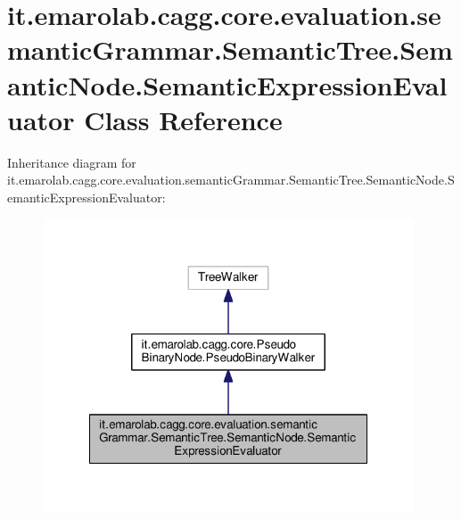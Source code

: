 \hypertarget{classit_1_1emarolab_1_1cagg_1_1core_1_1evaluation_1_1semanticGrammar_1_1SemanticTree_1_1Semantic4c3f840cd671383fb305cb0305b7229f}{\section{it.\-emarolab.\-cagg.\-core.\-evaluation.\-semantic\-Grammar.\-Semantic\-Tree.\-Semantic\-Node.\-Semantic\-Expression\-Evaluator Class Reference}
\label{classit_1_1emarolab_1_1cagg_1_1core_1_1evaluation_1_1semanticGrammar_1_1SemanticTree_1_1Semantic4c3f840cd671383fb305cb0305b7229f}
}


Inheritance diagram for it.\-emarolab.\-cagg.\-core.\-evaluation.\-semantic\-Grammar.\-Semantic\-Tree.\-Semantic\-Node.\-Semantic\-Expression\-Evaluator\-:\nopagebreak
\begin{figure}[H]
\begin{center}
\leavevmode
\includegraphics[width=312pt]{classit_1_1emarolab_1_1cagg_1_1core_1_1evaluation_1_1semanticGrammar_1_1SemanticTree_1_1Semanticefb0ca8a227731b7211d11b04621aadf}
\end{center}
\end{figure}


